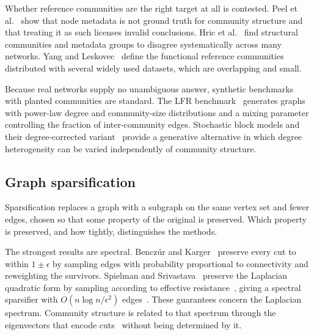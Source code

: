 Whether reference communities are the right target at all is contested.
Peel et al.~\cite{peel2017ground} show that node metadata is not ground truth for
community structure and that treating it as such licenses invalid conclusions.
Hric et al.~\cite{hric2014community} find structural communities and
metadata groups to disagree systematically across many networks. Yang and
Leskovec~\cite{yang2012defining} define the functional reference communities
distributed with several widely used datasets, which are overlapping and small.

Because real networks supply no unambiguous answer, synthetic benchmarks with
planted communities are standard. The LFR benchmark~\cite{lancichinetti2008benchmark}
generates graphs with power-law degree and community-size distributions and a
mixing parameter controlling the fraction of inter-community edges. Stochastic
block models and their degree-corrected variant~\cite{karrer2011stochastic}
provide a generative alternative in which degree heterogeneity can be varied
independently of community structure.

\subsection{Graph sparsification}\label{sec:background:spars}

Sparsification replaces a graph with a subgraph on the same vertex set and fewer
edges, chosen so that some property of the original is preserved. Which property
is preserved, and how tightly, distinguishes the methods.

The strongest results are spectral. Bencz\'ur and
Karger~\cite{benczur2015randomized} preserve every cut to within $1 \pm \epsilon$
by sampling edges with probability proportional to connectivity and reweighting
the survivors. Spielman and Srivastava~\cite{spielman2008graph} preserve the
Laplacian quadratic form by sampling according to effective
resistance~\cite{lovasz1993random, doyle1984random}, giving a spectral sparsifier
with $O(n \log n / \epsilon^2)$ edges~\cite{spielman2014nearly}. These guarantees
concern the Laplacian spectrum. Community structure is related to that spectrum
through the eigenvectors that encode cuts~\cite{von2007tutorial,
shi2000normalized, newman2013spectral} without being determined by it.

